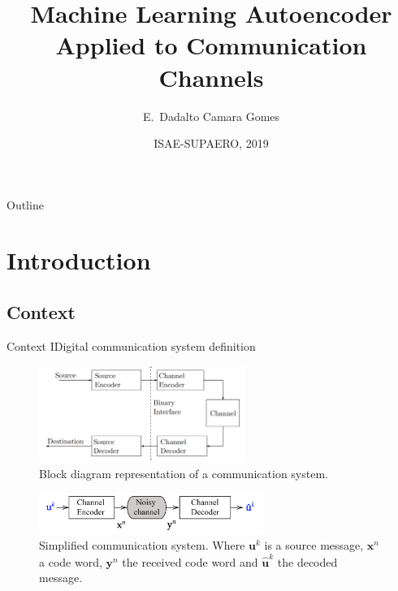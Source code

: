 \documentclass{beamer}
\title[Machine Learning and Communication]{Machine Learning Autoencoder Applied to Communication Channels}
\author{E.~Dadalto Camara Gomes\inst{1}}
\institute[] %
{
  \inst{1}%
   ISAE-SUPAERO\\
   Université de Toulouse\\
    31055, Toulouse, France\\
Email: eduardo.dadalto-camara-gomes@student.isae-supaero.fr
 }
\date{ISAE-SUPAERO, 2019}
\begin{document}
\begin{frame}
  \titlepage
\end{frame}

\begin{frame}{Outline}
  \tableofcontents
\end{frame}

\section{Introduction}
\subsection{Context}
\begin{frame}{Context I}{Digital communication system definition}
  
  
\begin{figure}
  \centering
   \includegraphics[width=0.6\textwidth]{images/Communication_system_schema_from_book}
  \caption{Block diagram representation of a communication system.}%
\end{figure}   
  
\begin{figure}
  \centering
   \includegraphics[width=0.65\textwidth]{images/simple_sys}
  \caption{Simplified communication system. Where $\textbf{u}^k$ is a source message, $\textbf{x}^n$ a code word, $\textbf{y}^n$ the received code word and $\hat{\textbf{u}}^k$ the decoded message.}\label{fig:cs}
\end{figure}  
  
\end{frame}
\end{document}
